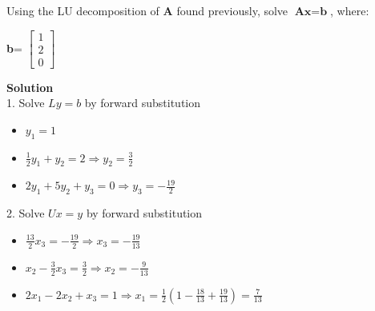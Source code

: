 \begin{exercise}{3} %
Using the LU decomposition of $\textbf{A}$ found previously, solve $\textbf{Ax}=\textbf{b}$, where:\\
\begin{center}
\textbf{b}= 
$\begin{bmatrix}
1\\2\\0 
\end{bmatrix}
$ 
\end{center}
\textbf{Solution}\\
1. Solve $Ly = b$ by forward substitution
\begin{itemize}
\item $y_1 = 1$
\item $\frac{1}{2}y_1 + y_2=2 \Rightarrow y_2=\frac{3}{2}$
\item $2y_1+5y_2+y_3=0 \Rightarrow y_3=-\frac{19}{2}$
\end{itemize}
2. Solve $Ux = y$ by forward substitution
\begin{itemize}
\item $\frac{13}{2}x_3=-\frac{19}{2} \Rightarrow x_3=-\frac{19}{13}$
\item $x_2-\frac{3}{2}x_3=\frac{3}{2} \Rightarrow x_2=-\frac{9}{13}$
\item $2x_1-2x_2+x_3=1 \Rightarrow x_1=\frac{1}{2}(1-\frac{18}{13}+\frac{19}{13})=\frac{7}{13}$
\end{itemize}
\end{exercise}
 
